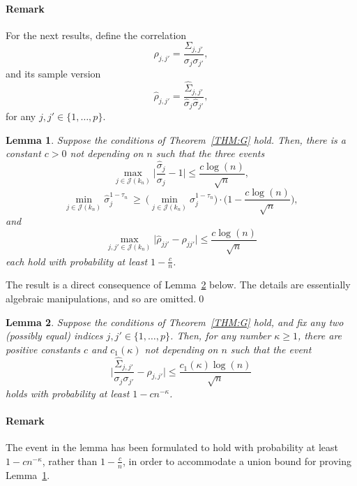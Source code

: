 \documentclass[aos,preprint]{imsart}
\numberwithin{equation}{section}
\theoremstyle{plain}
\newtheorem{lemma}{Lemma}[section]
\renewcommand{\hat}[1]{\widehat{#1}}
\newcommand{\J}{\mathcal{J}}
\newcommand{\ts}{\textstyle}
\newcommand{\1}{{\bf{1}}}
\newcommand{\0}{\mathbf{0}}
\begin{document}
\paragraph{Remark} For the next results, define the correlation 
$$\rho_{j,j'}=\ts\frac{\Sigma_{j,j'}}{\sigma_j\sigma_{j'}},$$ 
and its sample version 
$$\hat{\rho}_{j,j'}=\ts\frac{\hat\Sigma_{j,j'}}{\hat\sigma_j\hat\sigma_{j'}},$$
 for any $j,j'\in\{1,\dots,p\}$.
\begin{lemma}\label{lem:cor}
Suppose the conditions of Theorem~\ref{THM:G} hold. Then, there is a constant $c>0$ not depending on $n$ such that the three events
\begin{equation}\label{eqn:firstcor}
 \max_{j\in\J(k_n)}\Big| \ts\frac{\hat\sigma_j}{\sigma_j}-1\Big| \leq \ts \frac{c\log(n)}{\sqrt n},
\end{equation}
%
\begin{equation}
 \min_{j\in\J(k_n)}\hat\sigma_j^{1-\tau_n} \ \geq \ \Big(\min_{j\in\J(k_n)} \sigma_j^{1-\tau_n}\Big)\cdot \Big(1-\ts\frac{c\log(n)}{\sqrt n}\Big),
\end{equation}
and
\begin{equation}\label{eqn:firstcor}
 \max_{j,j'\in\J(k_n)}\big| \hat \rho_{jj'}-\rho_{jj'}\big| \leq \ts \frac{c\log(n)}{\sqrt n}
\end{equation}
each
hold with probability at least $1-\ts\frac{c}{n}$.
\end{lemma}
\proof The result is a direct consequence of Lemma~\ref{lem:corbasic} below. The details are essentially algebraic manipulations, and so are omitted.\qed



\begin{lemma}\label{lem:corbasic}
Suppose the conditions of Theorem~\ref{THM:G} hold, and fix any two (possibly equal) indices $j,j'\in\{1,\dots,p\}$.
 Then, for any number $\kappa\geq 1$, there are positive constants $c$ and $c_1(\kappa)$ not depending on $n$ such that the event
%
\begin{equation}\label{eqn:corevent}
 \Big| \ts\frac{\hat \Sigma_{j,j'}}{\sigma_j\sigma_{j'}}-\rho_{j,j'}\Big| \leq \frac{c_1(\kappa)\log(n)}{\sqrt n}
\end{equation}
holds with probability at least $1-cn^{-\kappa}$. 
\end{lemma}
\paragraph{Remark}The event in the lemma has been formulated to hold with probability at least $1-cn^{-\kappa}$, rather than $1-\frac{c}{n}$, in order to accommodate a union bound for proving Lemma~\ref{lem:cor}.
\end{document}
